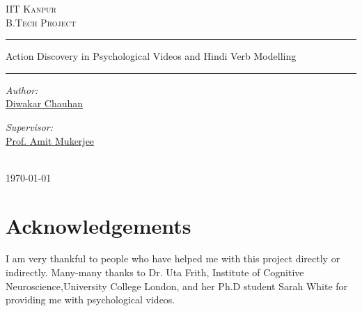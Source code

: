 \documentclass[a4paper, 10pt, notitlepage]{report}
\author{Diwakar Chauhan} %
\date{\today} %
\begin{document}
\begin{center}

{\color{blue}  \textsc{\LARGE IIT Kanpur}\\[1.5cm] }
\textsc{\Large B.Tech Project}\\[1cm]
\hrule height 2pt
\vspace*{10pt}
{\huge  Action Discovery in Psychological Videos and Hindi Verb Modelling}\\[0.4cm] 
\hrule height 2pt 
\vspace*{10pt}
\begin{minipage}{0.4\textwidth}
\begin{flushleft} \large
\emph{Author:}\\
{\color{blue} \href{http://home.iitk.ac.in/~diwakarc}{Diwakar Chauhan} }
\end{flushleft}
\end{minipage}
\begin{minipage}{0.4\textwidth}
\begin{flushright} \large
\emph{Supervisor:} \\
{\color{blue} \href{http://www.cse.iitk.ac.in/users/amit}{Prof. Amit Mukerjee } }%
\end{flushright}
\end{minipage}\\[3cm]


{\large \today}\\[4cm] %
\end{center}

\thispagestyle{empty}

\newpage
\section*{Acknowledgements} %
I am very thankful to people who have helped me with this project directly or indirectly.
Many-many thanks to Dr. Uta Frith, Institute of Cognitive Neuroscience,University College London, and  her Ph.D student Sarah White for providing me with psychological videos.\\%
\end{document}
